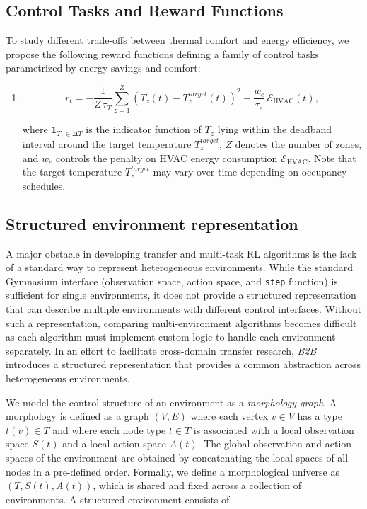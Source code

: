 \documentclass[10pt]{article} %
\newcommand{\btob}{{\textit{B2B}}}
\begin{document}
\subsection{Control Tasks and Reward Functions}
\label{sec:control_tasks_and_reward_functions}

To study different trade-offs between thermal comfort and energy efficiency, we propose the following reward functions defining a family of control tasks parametrized by energy savings and comfort: 

\begin{enumerate}
    \item \begin{equation}
\label{eq:deadband_reward}
r_t = - \frac{1}{Z \, \tau_T} \sum_{z=1}^Z 
 (T_z(t) - T^{target}_z(t))^2
- \frac{w_e}{\tau_e} \, \mathcal{E}_{\text{HVAC}}(t),
\end{equation}

where $\mathbf{1}_{T_z \in \Delta T}$ is the indicator function of $T_z$ lying within the deadband interval around the target temperature $T_z^{target}$, $Z$ denotes the number of zones, and $w_e$ controls the penalty on HVAC energy consumption $\mathcal{E}_{\text{HVAC}}$. Note that the target temperature $T_z^{target}$ may vary over time depending on occupancy schedules.

\end{enumerate}

\subsection{Structured environment representation}
\label{sec:structured-env}

A major obstacle in developing transfer and multi-task RL algorithms is the lack of a standard way to represent heterogeneous environments. While the standard Gymnasium interface (observation space, action space, and \texttt{step} function) is sufficient for single environments, it does not provide a structured representation that can describe multiple environments with different control interfaces. Without such a representation, comparing multi-environment algorithms becomes difficult as each algorithm must implement custom logic to handle each environment separately. In an effort to facilitate cross-domain transfer research, \btob{} introduces a structured representation that provides a common abstraction across heterogeneous environments.

We model the control structure of an environment as a \textit{morphology graph}. A morphology is defined as a graph $(V, E)$ where each vertex $v \in V$ has a type $t(v) \in T$ and where each node type $t \in T$ is associated with a local observation space $S(t)$ and a local action space $A(t)$. The global observation and action spaces of the environment are obtained by concatenating the local spaces of all nodes in a pre-defined order. Formally, we define a morphological universe  as $(T, S(t), A(t))$, which is shared and fixed across a collection of environments. A structured environment consists of
\end{document}

